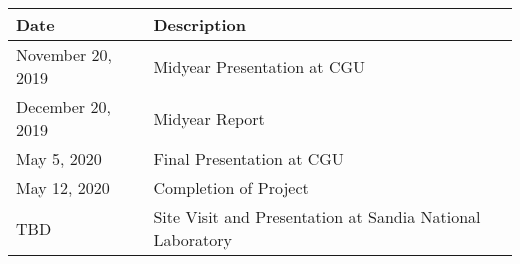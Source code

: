 \begin{tabular}{ l|l } 
 \hline
 Date & Description  \\
 \hline
 November 20, 2019 & Midyear Presentation at CGU   \\ 
 December 20, 2019 & Midyear Report \\ 
 May 5, 2020 & Final Presentation at CGU \\ 
 May 12, 2020 & Completion of Project \\ 
 TBD & Site Visit and Presentation at Sandia National Laboratory  \\ 
\end{tabular}\\
